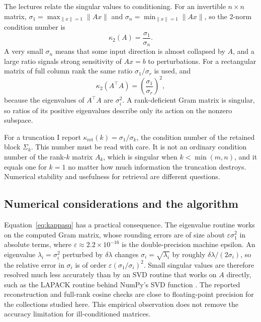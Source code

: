 \documentclass[12pt,a4paper]{report}
\newcommand{\norm}[1]{\lVert #1\rVert}
\newcommand{\T}{^{\top}}
\theoremstyle{plain}
\theoremstyle{definition}
\theoremstyle{remark}
\theoremstyle{definition}
\begin{document}
The lectures relate the singular values to conditioning. For an invertible $n\times n$ matrix, $\sigma_1=\max_{\norm{x}=1}\norm{Ax}$ and $\sigma_n=\min_{\norm{x}=1}\norm{Ax}$, so the 2-norm condition number is
\[
\kappa_2(A)=\frac{\sigma_1}{\sigma_n}.
\]
A very small $\sigma_n$ means that some input direction is almost collapsed by $A$, and a large ratio signals strong sensitivity of $Ax=b$ to perturbations. For a rectangular matrix of full column rank the same ratio $\sigma_1/\sigma_r$ is used, and
\begin{equation}\label{eq:kappasq}
\kappa_2(A\T A)=\left(\frac{\sigma_1}{\sigma_r}\right)^2 ,
\end{equation}
because the eigenvalues of $A\T A$ are $\sigma_i^2$. A rank-deficient Gram matrix is singular, so ratios of its positive eigenvalues describe only its action on the nonzero subspace.

For a truncation I report $\kappa_{\mathrm{ret}}(k)=\sigma_1/\sigma_k$, the condition number of the retained block $\Sigma_k$. This number must be read with care. It is not an ordinary condition number of the rank-$k$ matrix $A_k$, which is singular when $k<\min(m,n)$, and it equals one for $k=1$ no matter how much information the truncation destroys. Numerical stability and usefulness for retrieval are different questions.

\subsection{Numerical considerations and the algorithm}\label{sec:numerics}

Equation~\eqref{eq:kappasq} has a practical consequence. The eigenvalue routine works on the computed Gram matrix, whose rounding errors are of size about $\varepsilon\sigma_1^2$ in absolute terms, where $\varepsilon\approx2.2\times10^{-16}$ is the double-precision machine epsilon. An eigenvalue $\lambda_i=\sigma_i^2$ perturbed by $\delta\lambda$ changes $\sigma_i=\sqrt{\lambda_i}$ by roughly $\delta\lambda/(2\sigma_i)$, so the relative error in $\sigma_i$ is of order $\varepsilon(\sigma_1/\sigma_i)^2$. Small singular values are therefore resolved much less accurately than by an SVD routine that works on $A$ directly, such as the LAPACK routine behind NumPy's SVD function \cite{numpysvd,golubvanloan}. The reported reconstruction and full-rank cosine checks are close to floating-point precision for the collections studied here. This empirical observation does not remove the accuracy limitation for ill-conditioned matrices.
\end{document}
